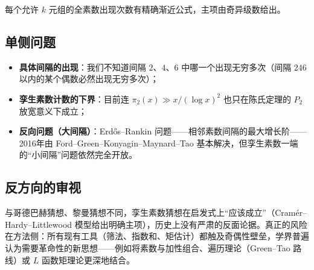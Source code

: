 \begin{conjecture}
    每个允许 $k$ 元组的全素数出现次数有精确渐近公式，主项由奇异级数给出。
\end{conjecture}

\subsection{单侧问题}

\begin{itemize}
    \item \textbf{具体间隔的出现}：我们不知道间隔 $2$、$4$、$6$ 中哪一个出现无穷多次（间隔 $246$ 以内的某个偶数必然出现无穷多次）；
    \item \textbf{孪生素数计数的下界}：目前连 $\pi_2(x) \gg x/(\log x)^{2}$ 也只在陈氏定理的 $P_2$ 放宽意义下成立；
    \item \textbf{反向问题（大间隔）}：Erd\H{o}s--Rankin 问题——相邻素数间隔的最大增长阶——2016年由 Ford--Green--Konyagin--Maynard--Tao 基本解决\cite{ford2016large}，但孪生素数一端的“小间隔”问题依然完全开放。
\end{itemize}

\subsection{反方向的审视}

与哥德巴赫猜想、黎曼猜想不同，孪生素数猜想在启发式上“应该成立”（Cram\'er--Hardy--Littlewood 模型给出明确主项），历史上没有严肃的反面论据。真正的风险在方法侧：所有现有工具（筛法、指数和、矩估计）都触及奇偶性壁垒，学界普遍认为需要革命性的新思想——例如将素数与加性组合、遍历理论（Green--Tao 路线）或 $L$ 函数矩理论更深地结合。

